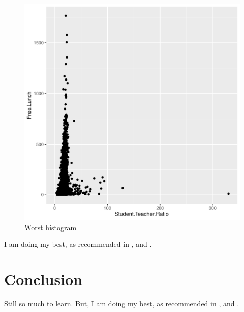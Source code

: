 \documentclass[a4paper, 12pt]{article}
\begin{document}
\begin{figure}[h]
\centering
\includegraphics{draft_paper_v2-theDeli_3}
\caption{Worst histogram}  %
\label{fig:theDeli_3} %
\end{figure}

I am doing my best, as recommended in \citet{magallanes_reyes_data_2022}, and \citet{leisch_sweave_2024}.




\section{Conclusion}

Still so much to learn. But, I am doing my best, as recommended in \citet{magallanes_reyes_data_2022}, and \citet{leisch_sweave_2024}. 



\end{document}
